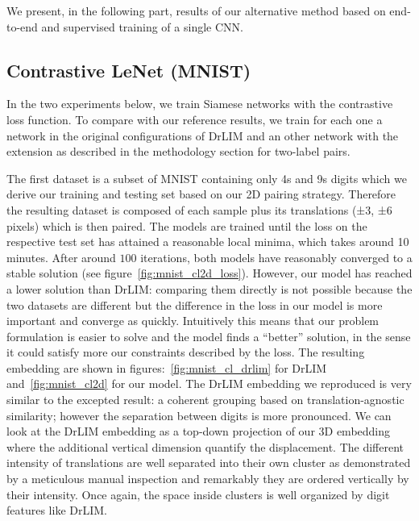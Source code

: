 \documentclass[a4paper,12pt]{report}
\begin{document}
We present, in the following part, results of our alternative method based on end-to-end and supervised training of a single CNN.

\subsection{Contrastive LeNet (MNIST)}

In the two experiments below, we train Siamese networks with the contrastive loss function.
To compare with our reference results, we train for each one a network in the original configurations of DrLIM and an other network with the extension as described in the methodology section for two-label pairs.

The first dataset is a subset of MNIST containing only 4s and 9s digits which we derive our training and testing set based on our 2D pairing strategy.
Therefore the resulting dataset is composed of each sample plus its translations (±3, ±6 pixels) which is then paired.
The models are trained until the loss on the respective test set has attained a reasonable local minima, which takes around 10 minutes.
After around $100$ iterations, both models have reasonably converged to a stable solution (see figure~\ref{fig:mnist_cl2d_loss}).
However, our model has reached a lower solution than DrLIM: comparing them directly is not possible because the two datasets are different but the difference in the loss in our model is more important and converge as quickly.
Intuitively this means that our problem formulation is easier to solve and the model finds a ``better'' solution, in the sense it could satisfy more our constraints described by the loss.
The resulting embedding are shown in figures:~\ref{fig:mnist_cl_drlim} for DrLIM and~\ref{fig:mnist_cl2d} for our model.
The DrLIM embedding we reproduced is very similar to the excepted result: a coherent grouping based on translation-agnostic similarity; however the separation between digits is more pronounced.
We can look at the DrLIM embedding as a top-down projection of our 3D embedding where the additional vertical dimension quantify the displacement.
The different intensity of translations are well separated into their own cluster as demonstrated by a meticulous manual inspection and remarkably they are ordered vertically by their intensity.
Once again, the space inside clusters is well organized by digit features like DrLIM.
\end{document}
